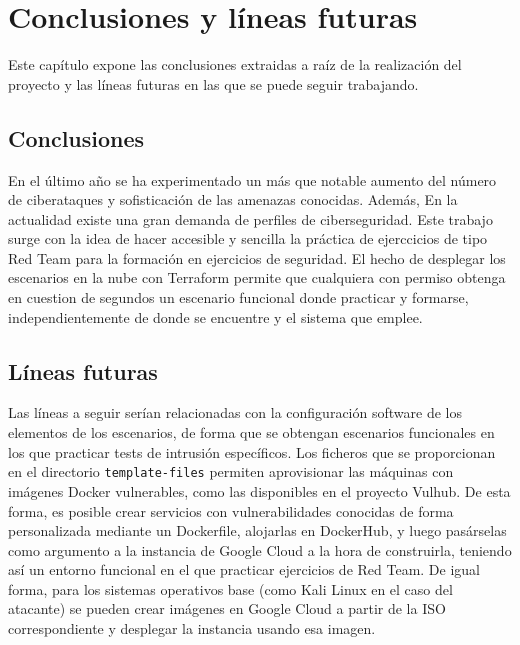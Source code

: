 \chapter{Conclusiones y líneas futuras} \label{ch:con}
  Este capítulo expone las conclusiones extraidas a raíz de la realización del proyecto y las líneas futuras en las que se puede seguir trabajando.

\section{Conclusiones} \label{sec:concs}
  En el último año se ha experimentado un más que notable aumento del número de ciberataques y sofisticación de las amenazas conocidas. Además, En la actualidad existe una gran demanda de perfiles de ciberseguridad. Este trabajo surge con la idea de hacer accesible y sencilla la práctica de ejerccicios de tipo Red Team para la formación en ejercicios de seguridad. El hecho de desplegar los escenarios en la nube con Terraform permite que cualquiera con permiso obtenga en cuestion de segundos un escenario funcional donde practicar y formarse, independientemente de donde se encuentre y el sistema que emplee.

\section{Líneas futuras} \label{sec:fut}
  Las líneas a seguir serían relacionadas con la configuración software de los elementos de los escenarios, de forma que se obtengan escenarios funcionales en los que practicar tests de intrusión específicos. Los ficheros que se proporcionan en el directorio \texttt{template-files} permiten aprovisionar las máquinas con imágenes Docker vulnerables, como las disponibles en el proyecto Vulhub. De esta forma, es posible crear servicios con vulnerabilidades conocidas de forma personalizada mediante un Dockerfile, alojarlas en DockerHub, y luego pasárselas como argumento a la instancia de Google Cloud a la hora de construirla, teniendo así un entorno funcional en el que practicar ejercicios de Red Team. De igual forma, para los sistemas operativos base (como Kali Linux en el caso del atacante) se pueden crear imágenes en Google Cloud a partir de la ISO correspondiente y desplegar la instancia usando esa imagen.
